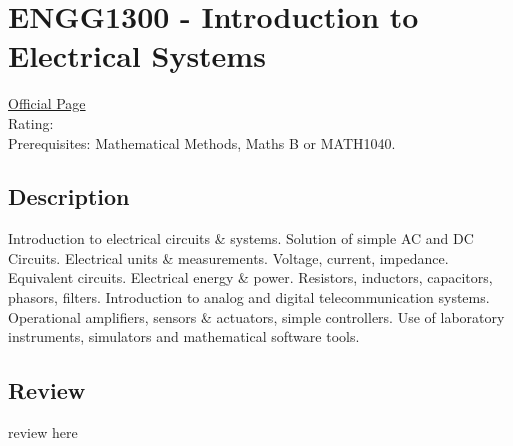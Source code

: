 \hypertarget{ENGG1300}{\section{ENGG1300 - Introduction to Electrical Systems}}

\large
\textcolor{turbo_purple}{\href{https://my.uq.edu.au/programs-courses/course.html?course_code=ENGG1300}{Official Page}} \\
Rating: \cstar\cstar\cstar\cstar\ostar \\
Prerequisites: Mathematical Methods, Maths B or MATH1040.

\normalsize
\subsection*{Description}
Introduction to electrical circuits \& systems.
Solution of simple AC and DC Circuits.
Electrical units \& measurements.
Voltage, current, impedance.
Equivalent circuits.
Electrical energy \& power.
Resistors, inductors, capacitors, phasors, filters.
Introduction to analog and digital telecommunication systems.
Operational amplifiers, sensors \& actuators, simple controllers.
Use of laboratory instruments, simulators and mathematical software tools.

\subsection*{Review}
review here
